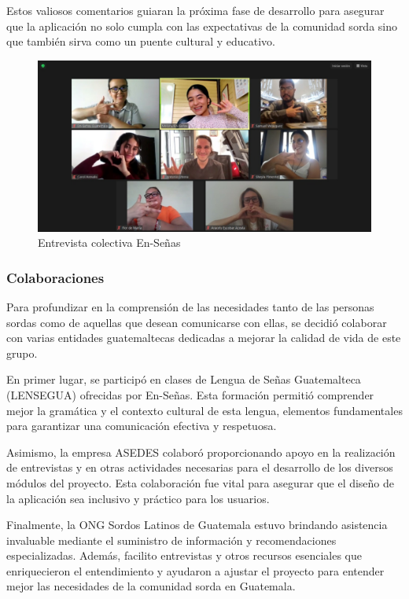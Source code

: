 Estos valiosos comentarios guiaran la próxima fase de desarrollo para asegurar que la aplicación no solo cumpla con las expectativas de la comunidad sorda sino que también sirva como un puente cultural y educativo.


\begin{figure} [H]
    \centering
    \includegraphics[width=0.75\linewidth]{figuras/entrevista_colectiva.png}
    \caption{Entrevista colectiva En-Señas}
    \label{fig:enter-label}
\end{figure}



\subsubsection{Colaboraciones}

Para profundizar en la comprensión de las necesidades tanto de las personas sordas como de aquellas que desean comunicarse con ellas, se decidió colaborar con varias entidades guatemaltecas dedicadas a mejorar la calidad de vida de este grupo.

En primer lugar, se participó en clases de Lengua de Señas Guatemalteca (LENSEGUA) ofrecidas por En-Señas. Esta formación permitió comprender mejor la gramática y el contexto cultural de esta lengua, elementos fundamentales para garantizar una comunicación efectiva y respetuosa.

Asimismo, la empresa ASEDES colaboró proporcionando apoyo en la realización de entrevistas y en otras actividades necesarias para el desarrollo de los diversos módulos del proyecto. Esta colaboración fue vital para asegurar que el diseño de la aplicación sea inclusivo y práctico para los usuarios.

Finalmente, la ONG Sordos Latinos de Guatemala estuvo brindando asistencia invaluable mediante el suministro de información y recomendaciones especializadas. Además, facilito entrevistas y otros recursos esenciales que enriquecieron el entendimiento y ayudaron a ajustar el proyecto para entender mejor las necesidades de la comunidad sorda en Guatemala.

